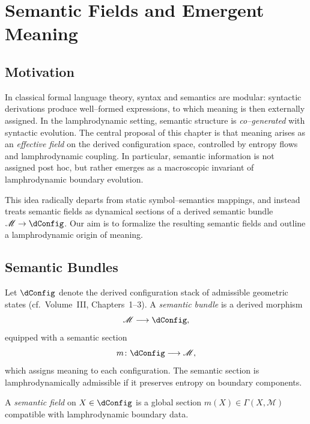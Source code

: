 
\chapter{Semantic Fields and Emergent Meaning}
\label{chap:semantic-fields}

\section{Motivation}

In classical formal language theory, syntax and semantics are modular:
syntactic derivations produce well–formed expressions, to which meaning
is then externally assigned. In the lamphrodynamic setting, semantic
structure is \emph{co–generated} with syntactic evolution. The central
proposal of this chapter is that meaning arises as an \emph{effective
field} on the derived configuration space, controlled by entropy flows
and lamphrodynamic coupling. In particular, semantic information is not
assigned post hoc, but rather emerges as a macroscopic invariant of
lamphrodynamic boundary evolution.

This idea radically departs from static symbol–semantics mappings, and
instead treats semantic fields as dynamical sections of a derived
semantic bundle $\mathscr{M}\to\dConfig$. Our aim is to formalize the
resulting semantic fields and outline a lamphrodynamic origin of meaning.


\section{Semantic Bundles}

Let $\dConfig$ denote the derived configuration stack of admissible
geometric states (cf.\ Volume~III, Chapters~1--3). A \emph{semantic
bundle} is a derived morphism
\[
  \mathscr{M} \longrightarrow \dConfig,
\]
equipped with a semantic section
\[
  m\colon \dConfig \longrightarrow \mathscr{M},
\]
which assigns meaning to each configuration. The semantic section is
lamphrodynamically admissible if it preserves entropy on boundary
components.

\begin{definition}
A \emph{semantic field} on $X\in\dConfig$ is a global section
$m(X)\in\Gamma(X,\mathscr{M})$ compatible with lamphrodynamic boundary
data.
\end{definition}

